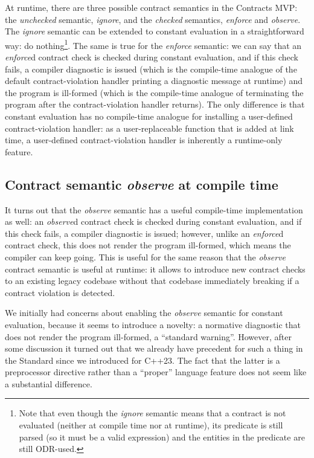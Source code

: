At runtime, there are three possible contract semantics in the Contracts MVP: the \emph{unchecked} semantic, \emph{ignore}, and the \emph{checked} semantics, \emph{enforce} and \emph{observe}. The \emph{ignore} semantic can be extended to constant evaluation in a straightforward way: do nothing\footnote{Note that even though the \emph{ignore} semantic means that a contract is not evaluated (neither at compile time nor at runtime), its predicate is still parsed (so it must be a valid expression) and the entities in the predicate are still ODR-used.}. The same is true for the \emph{enforce} semantic:  we can say that an \emph{enforce}d contract check is checked during constant evaluation, and if this check fails, a compiler diagnostic is issued (which is the compile-time analogue of the default contract-violation handler printing a diagnostic message at runtime) and the program is ill-formed (which is the compile-time analogue of terminating the program after the contract-violation handler returns). The only difference is that constant evaluation has no compile-time analogue for installing a user-defined contract-violation handler: as a user-replaceable function that is added at link time, a user-defined contract-violation handler is inherently a runtime-only feature.

\subsection{Contract semantic \emph{observe} at compile time}

It turns out that the \emph{observe} semantic has a useful compile-time implementation as well: an \emph{observe}d contract check is checked during constant evaluation, and if this check fails, a compiler diagnostic is issued; however, unlike an \emph{enforce}d contract check, this does not render the program ill-formed, which means the compiler can keep going. This is useful for the same reason that the \emph{observe} contract semantic is useful at runtime: it allows to introduce new contract checks to an existing legacy codebase without that codebase immediately breaking if a contract violation is detected.

We initially had concerns about enabling the \emph{observe} semantic for constant evaluation, because it seems to introduce a novelty: a normative diagnostic that does not render the program ill-formed, a ``standard warning''. However, after some discussion it turned out that we already have precedent for such a thing in the Standard since we introduced  \cite{P2437R1} for C++23. The fact that the latter is a preprocessor directive rather than a ``proper'' language feature does not seem like a substantial difference.

